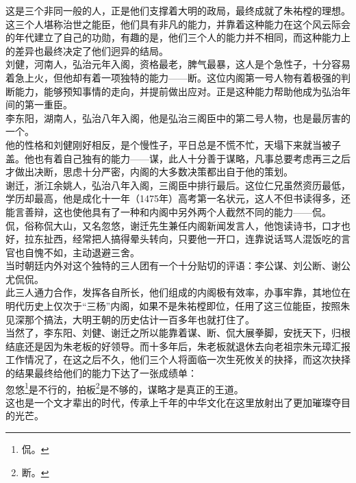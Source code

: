 \begin{multicols}{\theparacolNo}
这是三个非同一般的人，正是他们支撑着大明的政局，最终成就了朱祐樘的理想。这三个人堪称治世之能臣，他们具有非凡的能力，并靠着这种能力在这个风云际会的年代建立了自己的功勋，有趣的是，他们三个人的能力并不相同，而这种能力上的差异也最终决定了他们迥异的结局。\\

刘健，河南人，弘治元年入阁，资格最老，脾气最暴，这人是个急性子，十分容易着急上火，但他却有着一项独特的能力——断。这位内阁第一号人物有着极强的判断能力，能够预知事情的走向，并提前做出应对。正是这种能力帮助他成为弘治年间的第一重臣。\\

李东阳，湖南人，弘治八年入阁，他是弘治三阁臣中的第二号人物，也是最厉害的一个。\\

他的性格和刘健刚好相反，是个慢性子，平日总是不慌不忙，天塌下来就当被子盖。他也有着自己独有的能力——谋，此人十分善于谋略，凡事总要考虑再三之后才做出决断，思虑十分严密，内阁的大多数决策都出自于他的策划。\\

谢迁，浙江余姚人，弘治八年入阁，三阁臣中排行最后。这位仁兄虽然资历最低，学历却最高，他是成化十一年（1475年）高考第一名状元，这人不但书读得多，还能言善辩，这也使他具有了一种和内阁中另外两个人截然不同的能力——侃。\\

侃，俗称侃大山，又名忽悠，谢迁先生兼任内阁新闻发言人，他饱读诗书，口才也好，拉东扯西，经常把人搞得晕头转向，只要他一开口，连靠说话骂人混饭吃的言官也自愧不如，主动退避三舍。\\

当时朝廷内外对这个独特的三人团有一个十分贴切的评语：李公谋、刘公断、谢公尤侃侃。\\

此三人通力合作，发挥各自所长，他们组成的内阁极有效率，办事牢靠，其地位在明代历史上仅次于“三杨”内阁，如果不是朱祐樘即位，任用了这三位能臣，按照朱见深那个搞法，大明王朝的历史估计一百多年也就打住了。\\

当然了，李东阳、刘健、谢迁之所以能靠着谋、断、侃大展拳脚，安抚天下，归根结底还是因为朱老板的好领导。而十多年后，朱老板就退休去向老祖宗朱元璋汇报工作情况了，在这之后不久，他们三个人将面临一次生死攸关的抉择，而这次抉择的结果最终给他们的能力下达了一张成绩单：\\

忽悠\footnote{侃。}是不行的，拍板\footnote{断。}是不够的，谋略才是真正的王道。\\

这也是一个文才辈出的时代，传承上千年的中华文化在这里放射出了更加璀璨夺目的光芒。\\


\end{multicols}
